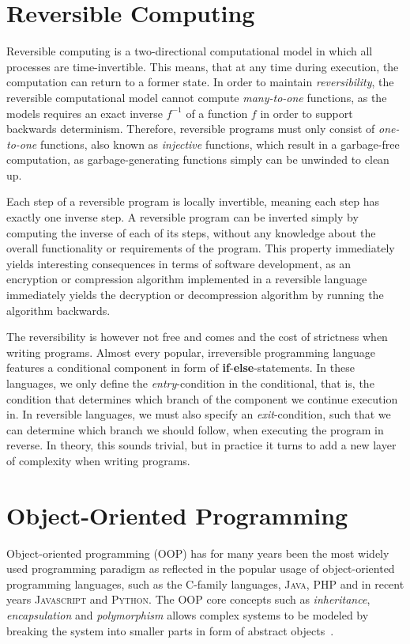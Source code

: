 \section{Reversible Computing}
\label{sec:reversible-computing}
Reversible computing is a two-directional computational model in which all processes are time-invertible. This means, that at any time during execution, the computation can return to a former state. In order to maintain \textit{reversibility}, the reversible computational model cannot compute \textit{many-to-one} functions, as the models requires an exact inverse $f^{-1}$ of a function $f$ in order to support backwards determinism. Therefore, reversible programs must only consist of \textit{one-to-one} functions, also known as \textit{injective} functions, which result in a garbage-free computation, as garbage-generating functions simply can be unwinded to clean up.

Each step of a reversible program is locally invertible, meaning each step has exactly one inverse step. A reversible program can be inverted simply by computing the inverse of each of its steps, without any knowledge about the overall functionality or requirements of the program. This property immediately yields interesting consequences in terms of software development, as an encryption or compression algorithm implemented in a reversible language immediately yields the decryption or decompression algorithm by running the algorithm backwards.

The reversibility is however not free and comes and the cost of strictness when writing programs. Almost every popular, irreversible programming language features a conditional component in form of \textbf{if}-\textbf{else}-statements. In these languages, we only define the \textit{entry}-condition in the conditional, that is, the condition that determines which branch of the component we continue execution in. In reversible languages, we must also specify an \textit{exit}-condition, such that we can determine which branch we should follow, when executing the program in reverse. In theory, this sounds trivial, but in practice it turns to add a new layer of complexity when writing programs.


\section{Object-Oriented Programming}
\label{sec:object-oriented-programming}
Object-oriented programming (OOP) has for many years been the most widely used programming paradigm as reflected in the popular usage of object-oriented programming languages, such as the \textsc{C}-family languages, \textsc{Java}, \textsc{PHP} and in recent years \textsc{Javascript} and \textsc{Python}. The OOP core concepts such as \textit{inheritance}, \textit{encapsulation} and \textit{polymorphism} allows complex systems to be modeled by breaking the system into smaller parts in form of abstract objects~\cite{jm:concepts}.


